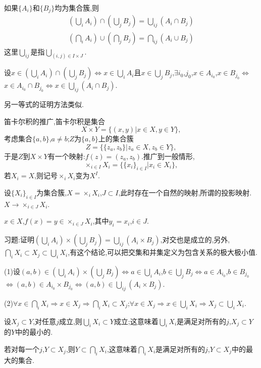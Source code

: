 \documentclass[12pt,a4paper,openany]{book}
\begin{document}
如果$\{A_i\}$和$\{B_j\}$均为集合簇,则
\begin{gather*}
(\bigcup_{i}{A_i}) \cap (\bigcup_{j}{B_j}) = \bigcup_{ij}{(A_i \cap B_j)} \\
(\bigcap_{i}{A_i}) \cup (\bigcap_{j}{B_j}) = \bigcap_{ij}{(A_i \cup B_j)}
\end{gather*}
这里$\bigcup_{ij}$是指$\bigcup_{(i,j) \in I \times J}$.

设$x \in (\bigcup_{i}{A_i}) \cap (\bigcup_{j}{B_j})$$\Leftrightarrow$$x \in \bigcup_{i}{A_i}$且$x \in \bigcup_{j}{B_j}$,$\exists i_0$,$j_0$,$x \in A_{i_0}$,$x \in B_{j_0}$$\Leftrightarrow$$x \in A_{i_0} \cap B_{j_0}$$\Leftrightarrow$$x \in \bigcup_{ij}{(A_i \cap B_j)}$.

另一等式的证明方法类似.

笛卡尔积的推广,笛卡尔积是集合
\[
X \times Y = \{(x,y)|x \in X, y \in Y\},
\]
考虑集合$\{a,b\}$,$a \neq b$;$Z$为$\{a,b\}$上的集合簇
\[
Z = \{\{z_a,z_b\}|z_a \in X, z_b \in Y\},
\]
于是$Z$到$X \times Y$有一个映射:$f(z)=(z_a,z_b)$.推广到一般情形,
\[
\times_{i \in I}{X_i} = \{\{x_i\}_{i \in I}|x_i \in X_i\},
\]
若$X_i=X$,则记号$\times_i{X_i}$变为$X^I$.

设$\{X_i\}_{i \in I}$为集合簇,$X = \times_i{X_i}$,$J \subset I$,此时存在一个自然的映射,所谓的投影映射.$X \to \times_{i \in J}{X_i}$.

$x \in X$,$f(x)=y \in \times_{i \in J}{X_i}$,其中$y_i=x_i$,$i \in J$.

习题:证明$(\bigcup_{i}{A_i}) \times (\bigcup_{j}{B_j}) = \bigcup_{ij}{(A_i \times B_j)}$,对交也是成立的,另外,$\bigcap_{i}{X_i} \subset X_j \subset \bigcup_{i}{X_i}$,有这个结论,可以把交集和并集定义为包含关系的极大极小值.

(1)设$(a,b) \in (\bigcup_{i}{A_i}) \times (\bigcup_{j}{B_j})$$\Leftrightarrow$$a \in \bigcup_{i}{A_i}$,$b \in \bigcup_{j}{B_j}$$\Leftrightarrow$$a \in A_{i_0}$,$b \in B_{j_0}$$\Leftrightarrow$$(a,b)\in A_{i_0} \times B_{j_0}$$\Leftrightarrow$$(a,b)\in \bigcup_{ij}{(A_i \times B_j)}$.

(2)$\forall x \in \bigcap_{i}{X_i}$$\Rightarrow$$x \in X_j$$\Rightarrow$$\bigcap_{i}{X_i}\subset X_j$;$\forall x \in X_j$$\Rightarrow$$x \in \bigcup_{i}{X_i}$$\Rightarrow$$X_j \subset \bigcup_{i}{X_i}$.

设$X_j \subset Y$,对任意$j$成立,则$\bigcup_{i}{X_i} \subset Y$成立;这意味着$\bigcup_{i}{X_i}$是满足对所有的$j$,$X_j \subset Y$的$Y$中的最小的.

若对每一个$j$,$Y \subset X_j$,则$Y \subset \bigcap_{i}{X_i}$,这意味着$\bigcap_{i}{X_i}$是满足对所有的$j$,$Y \subset X_j$中的最大的集合.
\end{document}
